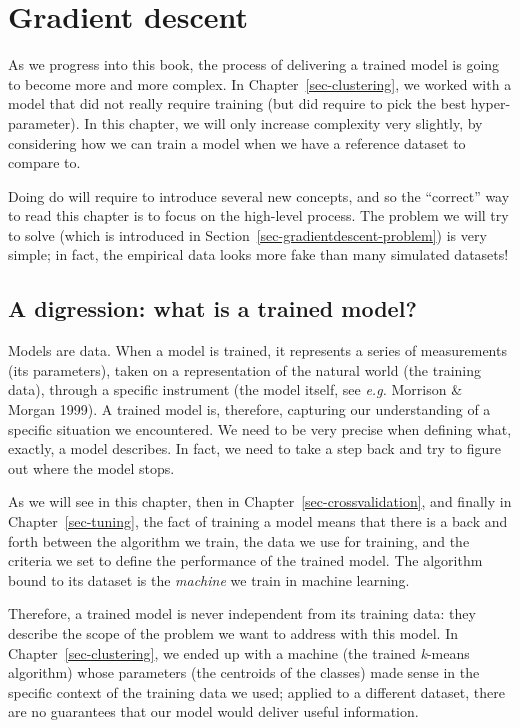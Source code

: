 \documentclass[
  letterpaper,
]{scrbook}
\begin{document}
\chapter{Gradient descent}\label{sec-gradientdescent}

As we progress into this book, the process of delivering a trained model
is going to become more and more complex. In
Chapter~\ref{sec-clustering}, we worked with a model that did not really
require training (but did require to pick the best hyper-parameter). In
this chapter, we will only increase complexity very slightly, by
considering how we can train a model when we have a reference dataset to
compare to.

Doing do will require to introduce several new concepts, and so the
``correct'' way to read this chapter is to focus on the high-level
process. The problem we will try to solve (which is introduced in
Section~\ref{sec-gradientdescent-problem}) is very simple; in fact, the
empirical data looks more fake than many simulated datasets!

\section{A digression: what is a trained
model?}\label{sec-gradientdescent-trainedmodel}

Models are data. When a model is trained, it represents a series of
measurements (its parameters), taken on a representation of the natural
world (the training data), through a specific instrument (the model
itself, see \emph{e.g.} Morrison \& Morgan 1999). A trained model is,
therefore, capturing our understanding of a specific situation we
encountered. We need to be very precise when defining what, exactly, a
model describes. In fact, we need to take a step back and try to figure
out where the model stops.

As we will see in this chapter, then in
Chapter~\ref{sec-crossvalidation}, and finally in
Chapter~\ref{sec-tuning}, the fact of training a model means that there
is a back and forth between the algorithm we train, the data we use for
training, and the criteria we set to define the performance of the
trained model. The algorithm bound to its dataset is the \emph{machine}
we train in machine learning.

Therefore, a trained model is never independent from its training data:
they describe the scope of the problem we want to address with this
model. In Chapter~\ref{sec-clustering}, we ended up with a machine (the
trained \emph{k}-means algorithm) whose parameters (the centroids of the
classes) made sense in the specific context of the training data we
used; applied to a different dataset, there are no guarantees that our
model would deliver useful information.
\end{document}
